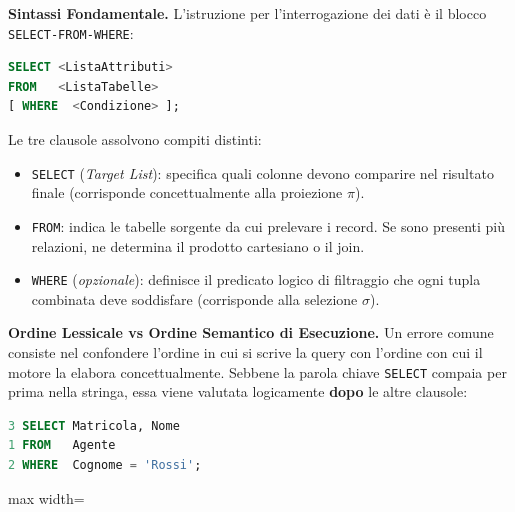 \documentclass[12pt]{extarticle}
\begin{document}
\medskip
\noindent \textbf{Sintassi Fondamentale.} L'istruzione per l'interrogazione dei dati è il blocco \texttt{SELECT-FROM-WHERE}:
\begin{lstlisting}[language=SQL]
SELECT <ListaAttributi>
FROM   <ListaTabelle>
[ WHERE  <Condizione> ];
\end{lstlisting}
Le tre clausole assolvono compiti distinti:
\begin{itemize}
    \item \texttt{SELECT} (\textit{Target List}): specifica quali colonne devono comparire nel risultato finale (corrisponde concettualmente alla proiezione $\pi$).
    \item \texttt{FROM}: indica le tabelle sorgente da cui prelevare i record. Se sono presenti più relazioni, ne determina il prodotto cartesiano o il join.
    \item \texttt{WHERE} (\textit{opzionale}): definisce il predicato logico di filtraggio che ogni tupla combinata deve soddisfare (corrisponde alla selezione $\sigma$).
\end{itemize}

\medskip
\noindent \textbf{Ordine Lessicale vs Ordine Semantico di Esecuzione.} Un errore comune consiste nel confondere l'ordine in cui si scrive la query con l'ordine con cui il motore la elabora concettualmente. Sebbene la parola chiave \texttt{SELECT} compaia per prima nella stringa, essa viene valutata logicamente \textbf{dopo} le altre clausole:

\begin{lstlisting}[language=SQL]
3 SELECT Matricola, Nome
1 FROM   Agente
2 WHERE  Cognome = 'Rossi';
\end{lstlisting}

\begin{center}
\begin{adjustbox}{max width=\linewidth}
\end{adjustbox}
\end{center}
\end{document}
